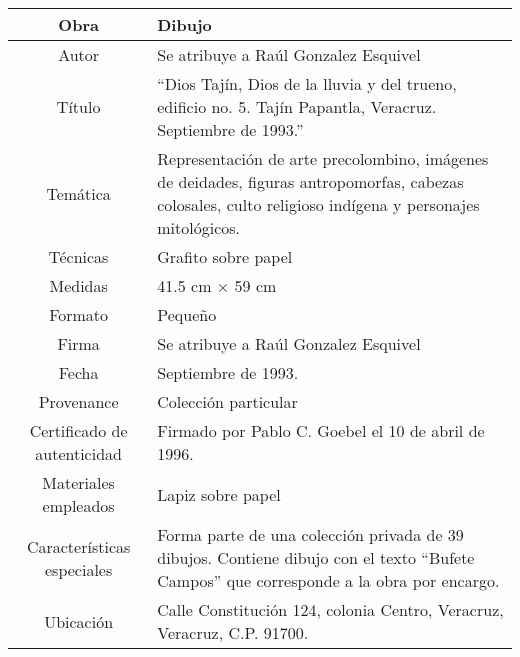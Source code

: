 \documentclass[10pt,letter]{report}
\begin{document}
\begin{table}[H]
\centering
\begin{tabular}{|c|m{}|}
\hline
Obra& Dibujo	\\
\hline
Autor & Se atribuye a Ra\'ul Gonzalez Esquivel\\
\hline
T\'itulo & ``Dios Taj\'in, Dios de la lluvia y del trueno, edificio no. 5. Taj\'in Papantla, Veracruz. Septiembre de 1993.''\\
\hline
Tem\'atica & Representaci\'on de arte precolombino, im\'agenes de deidades, figuras antropomorfas, cabezas colosales, culto religioso ind\'igena y personajes mitol\'ogicos.\\
\hline
T\'ecnicas &Grafito sobre papel \\
\hline
Medidas & 41.5 cm $\times$ 59 cm \\
\hline
 Formato & Peque\~no \\
 \hline
 Firma & Se atribuye a Ra\'ul Gonzalez Esquivel\\ 
 \hline
  Fecha & Septiembre de 1993.\\
 \hline
 Provenance & Colecci\'on particular\\
 \hline
 Certificado de autenticidad& Firmado por Pablo C. Goebel el 10 de abril de 1996.  \\
 \hline 
  Materiales empleados & Lapiz sobre papel\\
 \hline
 Caracter\'isticas especiales & Forma parte de una colecci\'on privada de 39 dibujos. 
Contiene dibujo con el texto ``Bufete Campos'' que corresponde a la obra por encargo. \\
\hline 
Ubicaci\'on & Calle Constituci\'on 124, colonia Centro, Veracruz, Veracruz, C.P. 91700.\\
\hline

\end{tabular}
\end{table}
\end{document}
